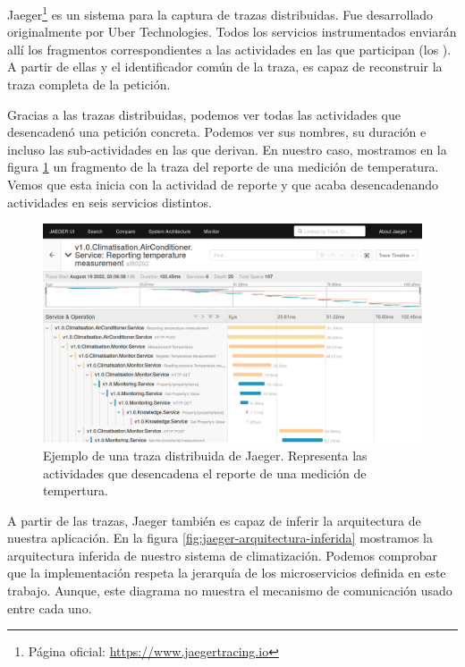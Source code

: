Jaeger\footnote{Página oficial: \url{https://www.jaegertracing.io}} es un sistema para la captura de trazas distribuidas. Fue desarrollado originalmente por Uber Technologies. Todos los servicios instrumentados enviarán allí los fragmentos correspondientes a las actividades en las que participan (los ). A partir de ellas y el identificador común de la traza, es capaz de reconstruir la traza completa de la petición.

Gracias a las trazas distribuidas, podemos ver todas las actividades que desencadenó una petición concreta. Podemos ver sus nombres, su duración e incluso las sub-actividades en las que derivan. En nuestro caso, mostramos en la figura \ref{fig:jaeger-traza-distribuida} un fragmento de la traza del reporte de una medición de temperatura. Vemos que esta inicia con la actividad de reporte y que acaba desencadenando actividades en seis servicios distintos.

\begin{figure}[htb]
  \centering
  \includegraphics[scale=0.35]{cap_despliegue/images/jaeger-traza-distribuida}
  \caption{Ejemplo de una traza distribuida de Jaeger. Representa las actividades que desencadena el reporte de una medición de tempertura.}
  \label{fig:jaeger-traza-distribuida}
\end{figure}

A partir de las trazas, Jaeger también es capaz de inferir la arquitectura de nuestra aplicación. En la figura \ref{fig:jaeger-arquitectura-inferida} mostramos la arquitectura inferida de nuestro sistema de climatización. Podemos comprobar que la implementación respeta la jerarquía de los microservicios definida en este trabajo. Aunque, este diagrama no muestra el mecanismo de comunicación usado entre cada uno.

